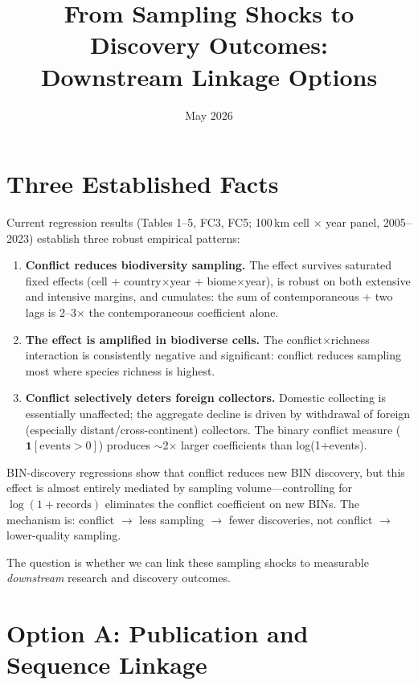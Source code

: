 \documentclass[10pt]{article}
\title{\vspace{-1.2cm}From Sampling Shocks to Discovery Outcomes:\\Downstream Linkage Options}
\author{}
\date{\vspace{-0.8cm}May 2026}
\begin{document}
\maketitle
\vspace{-1.2cm}

\section*{Three Established Facts}

Current regression results (Tables 1--5, FC3, FC5; 100\,km cell $\times$ year panel, 2005--2023) establish three robust empirical patterns:

\begin{enumerate}[label=(\alph*)]
    \item \textbf{Conflict reduces biodiversity sampling.} The effect survives saturated fixed effects (cell + country$\times$year + biome$\times$year), is robust on both extensive and intensive margins, and cumulates: the sum of contemporaneous + two lags is 2--3$\times$ the contemporaneous coefficient alone.
    \item \textbf{The effect is amplified in biodiverse cells.} The conflict$\times$richness interaction is consistently negative and significant: conflict reduces sampling most where species richness is highest.
    \item \textbf{Conflict selectively deters foreign collectors.} Domestic collecting is essentially unaffected; the aggregate decline is driven by withdrawal of foreign (especially distant/cross-continent) collectors. The binary conflict measure ($\mathbf{1}[\text{events}>0]$) produces $\sim$2$\times$ larger coefficients than log(1+events).
\end{enumerate}

BIN-discovery regressions show that conflict reduces new BIN discovery, but this effect is almost entirely mediated by sampling volume---controlling for $\log(1+\text{records})$ eliminates the conflict coefficient on new BINs. The mechanism is: conflict $\to$ less sampling $\to$ fewer discoveries, not conflict $\to$ lower-quality sampling.

The question is whether we can link these sampling shocks to measurable \emph{downstream} research and discovery outcomes.

\section*{Option A: Publication and Sequence Linkage}
\end{document}
